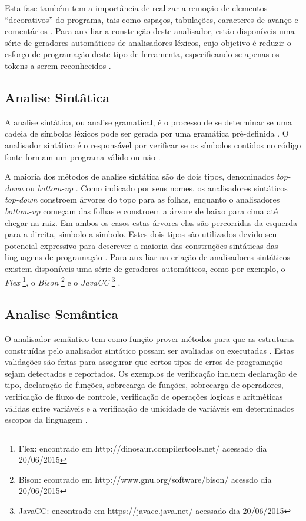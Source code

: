 Esta fase também tem a importância de realizar a remoção de elementos 
“decorativos” do programa, tais como espaços, tabulações, caracteres de 
avanço e comentários \cite{ref15}. Para auxiliar a construção deste analisador,
 estão disponíveis uma série de geradores automáticos de analisadores léxicos, 
cujo objetivo é reduzir o esforço de programação deste tipo de ferramenta, 
especificando-se apenas os tokens a serem reconhecidos \cite{ref18}.

\subsection{Analise Sintâtica}

A analise sintática, ou analise gramatical, é o processo de se determinar 
se uma cadeia de símbolos léxicos pode ser gerada por uma gramática pré-definida
 \cite{ref19}. O analisador sintático é o responsável por verificar se os 
símbolos contidos no código fonte formam um programa válido ou não \cite{ref20}.

A maioria dos métodos de analise sintática são de dois tipos, denominados 
\textit{top-down} ou \textit{bottom-up} \cite{ref21}. Como indicado por 
seus nomes, os analisadores sintáticos \textit{top-down} constroem árvores 
do topo para as folhas, enquanto o analisadores \textit{bottom-up} começam das 
folhas e constroem a árvore de baixo para cima até chegar na raiz. Em ambos os
 casos  estas árvores  elas são percorridas da esquerda para a direita, 
simbolo a simbolo. Estes dois tipos são utilizados devido seu potencial 
expressivo para descrever a maioria das construções sintáticas das linguagens 
de programação \cite{ref20}. Para auxiliar na criação de analisadores sintáticos 
existem disponíveis uma série de geradores automáticos, como por exemplo, 
o \textit{Flex} 
\footnote{Flex: encontrado em http://dinosaur.compilertools.net/ acessado dia 
20/06/2015}, 
o \textit{Bison} 
\footnote{Bison: econtrado em http://www.gnu.org/software/bison/ acessdo dia 
20/06/2015}
 e o \textit{JavaCC} 
\footnote{JavaCC: encontrado em https://javacc.java.net/ acessado dia 20/06/2015}
 \cite{ref22}.

\subsection{Analise Semântica}

O analisador semântico tem como função prover métodos para que as estruturas 
construídas pelo analisador sintático possam ser avaliadas ou executadas \cite{ref23}. 
Estas validações são feitas para assegurar que certos tipos de erros de 
programação sejam detectados e reportados. Os  exemplos de verificação incluem 
declaração de tipo, declaração de funções, sobrecarga de funções, sobrecarga de 
operadores, verificação de fluxo de controle, verificação de operações logicas e 
aritméticas válidas entre variáveis e a verificação de unicidade de variáveis em 
determinados escopos da linguagem \cite{ref24}.

